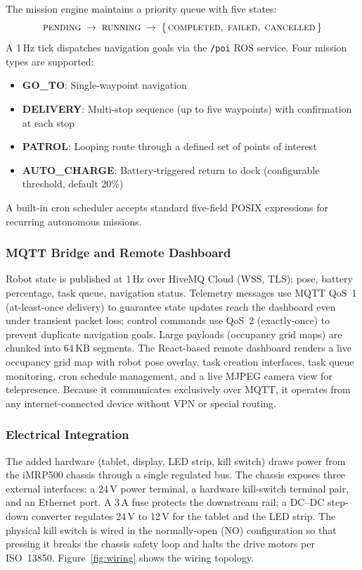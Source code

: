 The mission engine maintains a priority queue with five states:
\[
\textsc{pending} \;\to\; \textsc{running} \;\to\; \{\,\textsc{completed},\;\textsc{failed},\;\textsc{cancelled}\,\}
\]
A 1\,Hz tick dispatches navigation goals via the \texttt{/poi} ROS service. Four mission types are supported:
\begin{itemize}
  \item \textbf{GO\_TO}: Single-waypoint navigation
  \item \textbf{DELIVERY}: Multi-stop sequence (up to five waypoints) with confirmation at each stop
  \item \textbf{PATROL}: Looping route through a defined set of points of interest
  \item \textbf{AUTO\_CHARGE}: Battery-triggered return to dock (configurable threshold, default 20\%)
\end{itemize}
A built-in cron scheduler accepts standard five-field POSIX expressions for recurring autonomous missions.

\subsubsection{MQTT Bridge and Remote Dashboard}

Robot state is published at 1\,Hz over HiveMQ Cloud (WSS, TLS): pose, battery percentage, task queue, navigation status. Telemetry messages use MQTT QoS~1 (at-least-once delivery) to guarantee state updates reach the dashboard even under transient packet loss; control commands use QoS~2 (exactly-once) to prevent duplicate navigation goals. Large payloads (occupancy grid maps) are chunked into 64\,KB segments. The React-based remote dashboard renders a live occupancy grid map with robot pose overlay, task creation interfaces, task queue monitoring, cron schedule management, and a live MJPEG camera view for telepresence. Because it communicates exclusively over MQTT, it operates from any internet-connected device without VPN or special routing.

\subsubsection{Electrical Integration}

The added hardware (tablet, display, LED strip, kill switch) draws power from the iMRP500 chassis through a single regulated bus. The chassis exposes three external interfaces: a 24\,V power terminal, a hardware kill-switch terminal pair, and an Ethernet port. A 3\,A fuse protects the downstream rail; a DC--DC step-down converter regulates 24\,V to 12\,V for the tablet and the LED strip. The physical kill switch is wired in the normally-open (NO) configuration so that pressing it breaks the chassis safety loop and halts the drive motors per ISO~13850. Figure~\ref{fig:wiring} shows the wiring topology.

